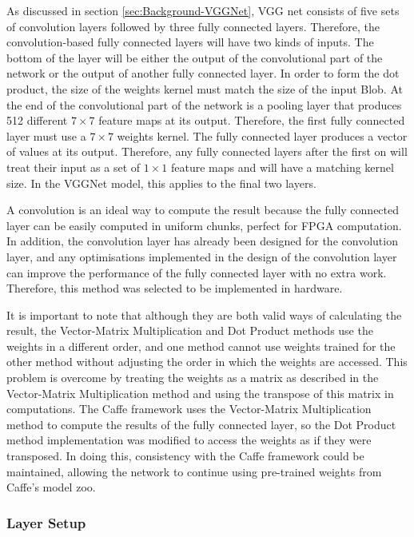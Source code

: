 \documentclass[12pt]{article}
\begin{document}
As discussed in section \ref{sec:Background-VGGNet}, VGG net consists of five sets of convolution layers followed by three fully connected layers. Therefore, the convolution-based fully connected layers will have two kinds of inputs. The bottom of the layer will be either the output of the convolutional part of the network or the output of another fully connected layer. In order to form the dot product, the size of the weights kernel must match the size of the input Blob. At the end of the convolutional part of the network is a pooling layer that produces 512 different $7 \times 7$ feature maps at its output. Therefore, the first fully connected layer must use a $7 \times 7$ weights kernel. The fully connected layer produces a vector of values at its output. Therefore, any fully connected layers after the first on will treat their input as a set of $1 \times 1$ feature maps and will have a matching kernel size. In the VGGNet model, this applies to the final two layers.

A convolution is an ideal way to compute the result because the fully connected layer can be easily computed in uniform chunks, perfect for FPGA computation. In addition, the convolution layer has already been designed for the convolution layer, and any optimisations implemented in the design of the convolution layer can improve the performance of the fully connected layer with no extra work. Therefore, this method was selected to be implemented in hardware.

It is important to note that although they are both valid ways of calculating the result, the Vector-Matrix Multiplication and Dot Product methods use the weights in a different order, and one method cannot use weights trained for the other method without adjusting the order in which the weights are accessed. This problem is overcome by treating the weights as a matrix as described in the Vector-Matrix Multiplication method and using the transpose of this matrix in computations. The Caffe framework uses the Vector-Matrix Multiplication method to compute the results of the fully connected layer, so the Dot Product method implementation was modified to access the weights as if they were transposed. In doing this, consistency with the Caffe framework could be maintained, allowing the network to continue using pre-trained weights from Caffe's model zoo.

\subsubsection{Layer Setup}
\label{sec:Design-FC-Setup}
\end{document}
